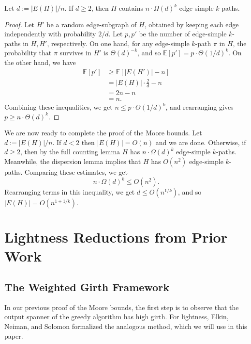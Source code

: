 \documentclass{theoretics}
\begin{document}
\begin{lemma}  \label{lem:moorefc}
Let $d := |E(H)|/n$.
If $d \ge 2$, then $H$ contains $n \cdot \Omega(d)^k$ edge-simple $k$-paths.
\end{lemma}
\begin{proof}
Let $H'$ be a random edge-subgraph of $H$, obtained by keeping each edge independently with probability $2/d$.
Let $p, p'$ be the number of edge-simple $k$-paths in $H, H'$, respectively.
On one hand, for any edge-simple $k$-path $\pi$ in $H$, the probability that $\pi$ survives in $H'$ is $\Theta(d)^{-k}$, and so
$\mathbb{E}[p'] = p \cdot \Theta(1/d)^{k}$.
On the other hand, we have
\begin{align*}
\mathbb{E}[p'] &\ge \mathbb{E}[|E(H')| - n] \tag*{Medium Counting Lemma}\\
&= |E(H)| \cdot \frac{2}{d} - n\\
&= 2n - n\\
&= n.
\end{align*}
Combining these inequalities, we get $n \le p \cdot \Theta(1/d)^{k}$, and rearranging gives $p \ge n \cdot \Theta(d)^k$.
\end{proof}

We are now ready to complete the proof of the Moore bounds.
Let $d := |E(H)|/n$.
If $d < 2$ then $|E(H)| = O(n)$ and we are done.
Otherwise, if $d \ge 2$, then by the full counting lemma $H$ has $n \cdot \Omega(d)^k$ edge-simple $k$-paths.
Meanwhile, the dispersion lemma implies that $H$ has $O(n^2)$ edge-simple $k$-paths.
Comparing these estimates, we get
$$n \cdot \Omega(d)^k \le O(n^2).$$
Rearranging terms in this inequality, we get
$d \le O(n^{1/k})$,
and so $|E(H)| = O(n^{1+1/k})$.


\section{Lightness Reductions from Prior Work \label{sec:priorwork}}

\subsection{The Weighted Girth Framework \label{sec:wtgirth}}

In our previous proof of the Moore bounds, the first step is to observe that the output spanner of the greedy algorithm has high girth.
For lightness, Elkin, Neiman, and Solomon \cite{ENS15} formalized the analogous method, which we will use in this paper.
\end{document}

